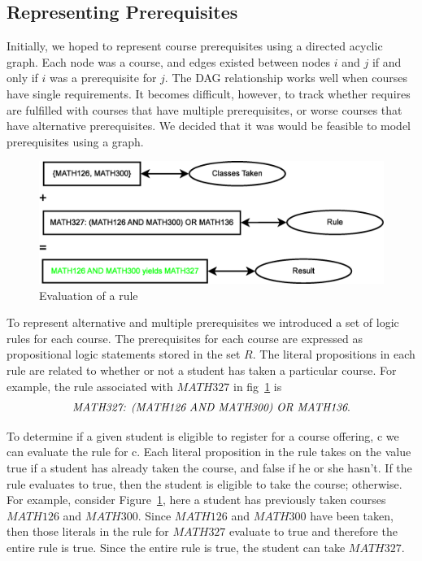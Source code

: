 \documentclass[11pt]{article} %
\begin{document}
\subsection{Representing Prerequisites} Initially, we hoped to represent course
prerequisites using a directed acyclic graph. Each node was a course, and edges
existed between nodes $i$ and $j$ if and only if $i$ was a prerequisite for $j$.
The DAG relationship works well when courses have single requirements. It
becomes difficult, however, to track whether requires are fulfilled with courses
that have multiple prerequisites, or worse courses that have alternative
prerequisites. We decided that it was would be feasible to model prerequisites
using a graph.
\begin{figure} [ht] 
    \begin{center}
        \includegraphics[scale=0.4]{prereq_logic_example} 
    \end{center}
    \caption{Evaluation of a rule} 
    \label{logic_ex} 
\end{figure}

To represent alternative and multiple prerequisites we introduced a set of logic
rules for each course. The prerequisites for each course are expressed as
propositional logic statements stored in the set $R$. The literal propositions
in each rule are related to whether or not a student has taken a particular
course. For example, the rule associated with $MATH327$ in fig~\ref{logic_ex} is
$$ \text{{\it MATH327: (MATH126 AND MATH300) OR MATH136}}.$$

To determine if a given student is eligible to register for a course offering,
c we can evaluate the rule for c. Each literal proposition in the rule takes on
the value true if a student has already taken the course, and false if he or she
hasn't.  If the rule evaluates to true, then the student is eligible to take the
course; otherwise. For example, consider Figure~\ref{logic_ex}, here a student
has previously taken courses $MATH126$ and $MATH300$. Since $MATH126$ and
$MATH300$ have been taken, then those literals in the rule for $MATH327$
evaluate to true and therefore the entire rule is true.  Since the entire rule
is true, the student can take $MATH327$.
\end{document}
